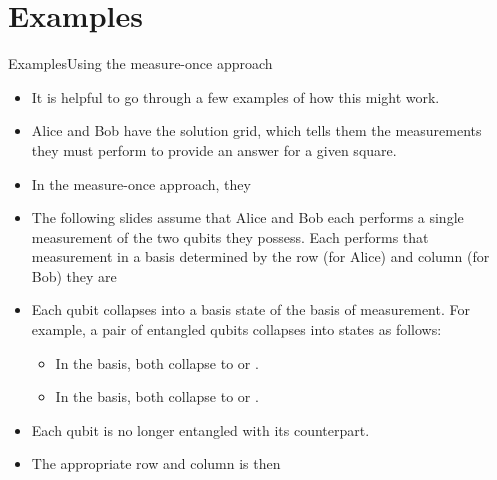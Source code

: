 \section*{Examples}
\begin{frame}{Examples}{Using the measure-once approach}

\begin{itemize}
    \item It is helpful to go through a few examples of how this might work.
    \item Alice and Bob have the solution grid, which tells them the measurements they must perform to provide an answer for a given square.
    \item In the measure-once approach, they 
    \item The following slides assume that Alice and Bob each performs a single measurement of the two qubits they possess.  Each performs that measurement in a basis determined by the row (for Alice) and column (for Bob) they are 
    \item Each qubit collapses into a basis state of the basis of measurement.  For example, a pair of entangled qubits collapses into states as follows:
    \begin{itemize}
        \item In the \PauliZ{} basis, both collapse to \QZero{} or \QOne{}.
        \item In the \PauliX{} basis, both collapse to \ket{+} or \ket{-}.
    \end{itemize}
    \item Each qubit is no longer entangled with its counterpart.
    \item The appropriate row and column is then 
\end{itemize}
\end{frame}

